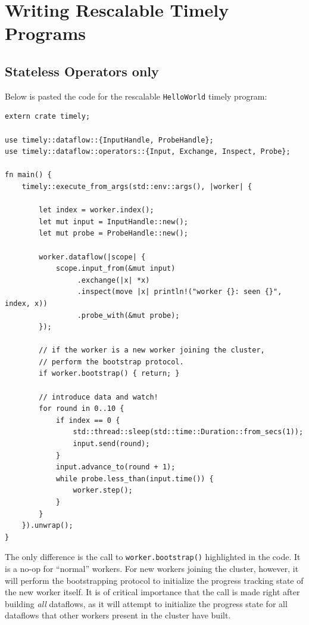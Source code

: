\documentclass[12pt]{extarticle}
\begin{document}
\section{Writing Rescalable Timely Programs}

\subsection{Stateless Operators only}

Below is pasted the code for the rescalable \verb|HelloWorld| timely program:

\begin{verbatim}
extern crate timely;

use timely::dataflow::{InputHandle, ProbeHandle};
use timely::dataflow::operators::{Input, Exchange, Inspect, Probe};

fn main() {
    timely::execute_from_args(std::env::args(), |worker| {

        let index = worker.index();
        let mut input = InputHandle::new();
        let mut probe = ProbeHandle::new();

        worker.dataflow(|scope| {
            scope.input_from(&mut input)
                 .exchange(|x| *x)
                 .inspect(move |x| println!("worker {}: seen {}", index, x))
                 .probe_with(&mut probe);
        });

        // if the worker is a new worker joining the cluster,
        // perform the bootstrap protocol.
        if worker.bootstrap() { return; }

        // introduce data and watch!
        for round in 0..10 {
            if index == 0 {
                std::thread::sleep(std::time::Duration::from_secs(1));
                input.send(round);
            }
            input.advance_to(round + 1);
            while probe.less_than(input.time()) {
                worker.step();
            }
        }
    }).unwrap();
}
\end{verbatim}

The only difference is the call to \verb|worker.bootstrap()| highlighted in the code.
It is a no-op for ``normal'' workers. For new workers joining the cluster, however,
it will perform the bootstrapping protocol to initialize the progress tracking state of the new worker itself.
It is of critical importance that the call is made right after building \textit{all} dataflows,
as it will attempt to initialize the progress state for all dataflows that other workers present
in the cluster have built.
\end{document}
